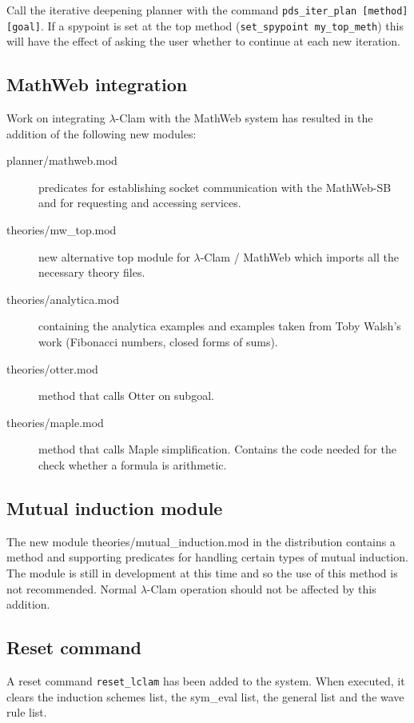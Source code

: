 \documentclass[11pt]{article}
\begin{document}
\noindent Call the iterative deepening planner with the command
\texttt{pds\_iter\_plan [method] [goal]}.  If a spypoint is set at the top
method (\texttt{set\_spypoint my\_top\_meth}) this will have the effect
of asking the user whether to continue at each new iteration.

\subsection{MathWeb integration}
Work on integrating $\lambda$-Clam with the MathWeb system has
resulted in the addition of the following new modules:

\begin{description}
\item[planner/mathweb.mod]
predicates for establishing socket communication with the MathWeb-SB and
for requesting and accessing services.

\item[theories/mw\_top.mod] new alternative top module for
  $\lambda$-Clam / MathWeb which imports all the necessary theory
  files.

\item[theories/analytica.mod]
containing the analytica examples and examples taken 
from Toby Walsh's work (Fibonacci numbers, closed forms of sums).

\item[theories/otter.mod] method that calls Otter on subgoal.

\item[theories/maple.mod] method that calls Maple simplification.
  Contains the code needed for the check whether a formula is
  arithmetic.

\end{description}

\subsection{Mutual induction module}
The new module theories/mutual\_induction.mod in the distribution
contains a method and supporting predicates for handling certain types
of mutual induction.  The module is still in development at this time
and so the use of this method is not recommended.  Normal
$\lambda$-Clam operation should not be affected by this addition.

\subsection{Reset command}
A reset command \texttt{reset\_lclam} has been added to the system.
When executed, it clears the induction schemes list, the sym\_eval
list, the general list and the wave rule list.
\end{document}
